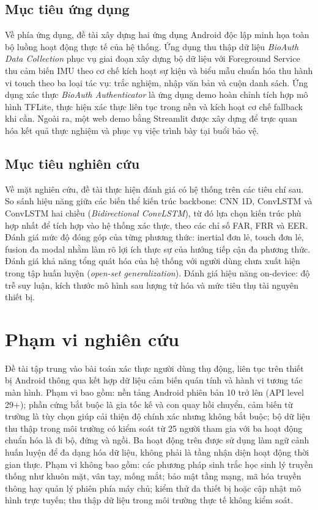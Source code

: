 \documentclass[../DoAn.tex]{subfiles}
\begin{document}
    \subsection{Mục tiêu ứng dụng}

    Về phía ứng dụng, đề tài xây dựng hai ứng dụng Android độc lập minh họa toàn bộ luồng hoạt động thực tế của hệ thống. Ứng dụng thu thập dữ liệu \textit{BioAuth Data Collection} phục vụ giai đoạn xây dựng bộ dữ liệu với Foreground Service thu cảm biến IMU theo cơ chế kích hoạt sự kiện và biểu mẫu chuẩn hóa thu hành vi touch theo ba loại tác vụ: trắc nghiệm, nhập văn bản và cuộn danh sách. Ứng dụng xác thực \textit{BioAuth Authenticator} là ứng dụng demo hoàn chỉnh tích hợp mô hình TFLite, thực hiện xác thực liên tục trong nền và kích hoạt cơ chế fallback khi cần. Ngoài ra, một web demo bằng Streamlit được xây dựng để trực quan hóa kết quả thực nghiệm và phục vụ việc trình bày tại buổi bảo vệ.

    \subsection{Mục tiêu nghiên cứu}

    Về mặt nghiên cứu, đề tài thực hiện đánh giá có hệ thống trên các tiêu chí sau. So sánh hiệu năng giữa các biến thể kiến trúc backbone: CNN 1D, ConvLSTM và ConvLSTM hai chiều (\textit{Bidirectional ConvLSTM}), từ đó lựa chọn kiến trúc phù hợp nhất để tích hợp vào hệ thống xác thực, theo các chỉ số FAR, FRR và EER. Đánh giá mức độ đóng góp của từng phương thức: inertial đơn lẻ, touch đơn lẻ, fusion đa modal nhằm làm rõ lợi ích thực sự của hướng tiếp cận đa phương thức. Đánh giá khả năng tổng quát hóa của hệ thống với người dùng chưa xuất hiện trong tập huấn luyện (\textit{open-set generalization}). Đánh giá hiệu năng on-device: độ trễ suy luận, kích thước mô hình sau lượng tử hóa và mức tiêu thụ tài nguyên thiết bị.

    \section{Phạm vi nghiên cứu}
    \label{sec:phamvi}

    Đề tài tập trung vào bài toán xác thực người dùng thụ động, liên tục trên thiết bị Android thông qua kết hợp dữ liệu cảm biến quán tính và hành vi tương tác màn hình. Phạm vi bao gồm: nền tảng Android phiên bản 10 trở lên (API level 29+); phần cứng bắt buộc là gia tốc kế và con quay hồi chuyển, cảm biến từ trường là tùy chọn giúp cải thiện độ chính xác nhưng không bắt buộc; bộ dữ liệu thu thập trong môi trường có kiểm soát từ 25 người tham gia với ba hoạt động chuẩn hóa là đi bộ, đứng và ngồi. Ba hoạt động trên được sử dụng làm ngữ cảnh huấn luyện để đa dạng hóa dữ liệu, không phải là tầng nhận diện hoạt động thời gian thực. Phạm vi không bao gồm: các phương pháp sinh trắc học sinh lý truyền thống như khuôn mặt, vân tay, mống mắt; bảo mật tầng mạng, mã hóa truyền thông hay quản lý phiên phía máy chủ; kiểm thử đa thiết bị hoặc cập nhật mô hình trực tuyến; thu thập dữ liệu trong môi trường thực tế không kiểm soát.
    
\end{document}
